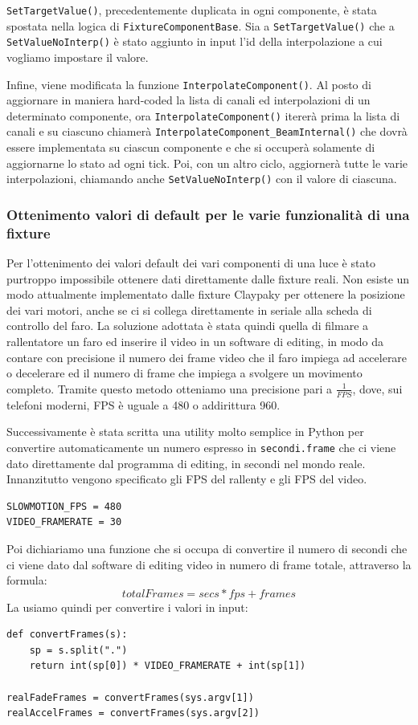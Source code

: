 \documentclass[main.tex]{subfiles}
\begin{document}
\lstinline{SetTargetValue()}, precedentemente duplicata in ogni componente, è stata spostata nella logica di \lstinline{FixtureComponentBase}. Sia a \lstinline{SetTargetValue()} che a \lstinline{SetValueNoInterp()} è stato aggiunto in input l'id della interpolazione a cui vogliamo impostare il valore. 

Infine, viene modificata la funzione \lstinline{InterpolateComponent()}. Al posto di aggiornare in maniera hard-coded la lista di canali ed interpolazioni di un determinato componente, ora \lstinline{InterpolateComponent()} itererà prima la lista di canali e su ciascuno chiamerà \lstinline{InterpolateComponent_BeamInternal()} che dovrà essere implementata su ciascun componente e che si occuperà solamente di aggiornarne lo stato ad ogni tick. Poi, con un altro ciclo, aggiornerà tutte le varie interpolazioni, chiamando anche \lstinline{SetValueNoInterp()} con il valore di ciascuna.

\clearpage
\subsubsection{Ottenimento valori di default per le varie funzionalità di una fixture}\label{subsec:3_1_defaultValues}
Per l'ottenimento dei valori default dei vari componenti di una luce è stato purtroppo impossibile ottenere dati direttamente dalle fixture reali. Non esiste un modo attualmente implementato dalle fixture Claypaky per ottenere la posizione dei vari motori, anche se ci si collega direttamente in seriale alla scheda di controllo del faro. La soluzione adottata è stata quindi quella di filmare a rallentatore un faro ed inserire il video in un software di editing, in modo da contare con precisione il numero dei frame video che il faro impiega ad accelerare o decelerare ed il numero di frame che impiega a svolgere un movimento completo. Tramite questo metodo otteniamo una precisione pari a $\frac{1}{FPS}$, dove, sui telefoni moderni, FPS è uguale a 480 o addirittura 960.\newline

Successivamente è stata scritta una utility molto semplice in Python per convertire automaticamente un numero espresso in \lstinline{secondi.frame} che ci viene dato direttamente dal programma di editing, in secondi nel mondo reale. \newline
Innanzitutto vengono specificato gli FPS del rallenty e gli FPS del video.
\lstset{language=python}
\begin{lstlisting}
SLOWMOTION_FPS = 480
VIDEO_FRAMERATE = 30
\end{lstlisting}
Poi dichiariamo una funzione che si occupa di convertire il numero di secondi che ci viene dato dal software di editing video in numero di frame totale, attraverso la formula:
\[totalFrames = secs * fps + frames\]
La usiamo quindi per convertire i valori in input:
\begin{lstlisting}
def convertFrames(s):
    sp = s.split(".")
    return int(sp[0]) * VIDEO_FRAMERATE + int(sp[1])

realFadeFrames = convertFrames(sys.argv[1])
realAccelFrames = convertFrames(sys.argv[2])
\end{lstlisting}
\end{document}
